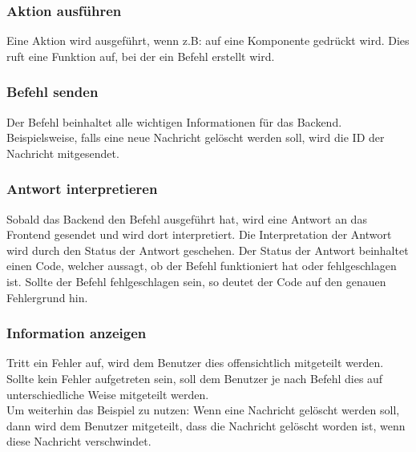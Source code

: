 \subsubsection{Aktion ausführen}
Eine Aktion wird ausgeführt, wenn z.B: auf eine Komponente gedrückt wird. Dies ruft eine Funktion auf, bei der ein Befehl erstellt wird.

\subsubsection{Befehl senden}
Der Befehl beinhaltet alle wichtigen Informationen für das Backend. Beispielsweise, falls eine neue Nachricht gelöscht werden soll, wird die ID der Nachricht mitgesendet.

\subsubsection{Antwort interpretieren}
Sobald das Backend den Befehl ausgeführt hat, wird eine Antwort an das Frontend gesendet und wird dort interpretiert. Die Interpretation der Antwort wird durch den Status der Antwort geschehen. Der Status der Antwort beinhaltet einen Code, welcher aussagt, ob der Befehl funktioniert hat oder fehlgeschlagen ist. Sollte der Befehl fehlgeschlagen sein, so deutet der Code auf den genauen Fehlergrund hin.

\subsubsection{Information anzeigen}
Tritt ein Fehler auf, wird dem Benutzer dies offensichtlich mitgeteilt werden.\\
Sollte kein Fehler aufgetreten sein, soll dem Benutzer je nach Befehl dies auf unterschiedliche Weise mitgeteilt werden.\\
Um weiterhin das Beispiel zu nutzen: Wenn eine Nachricht gelöscht werden soll, dann wird dem Benutzer mitgeteilt, dass die Nachricht gelöscht worden ist, wenn diese Nachricht verschwindet.